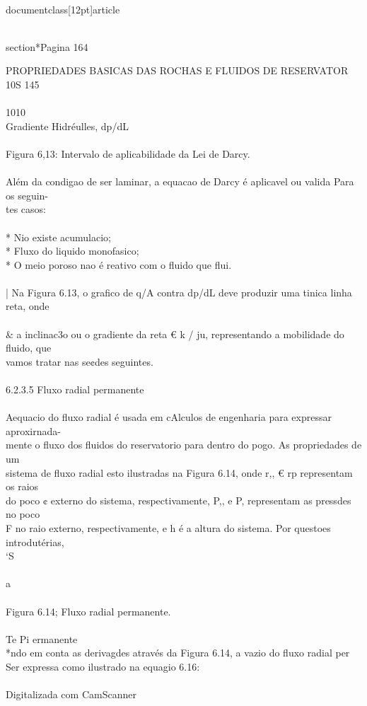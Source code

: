 \\documentclass[12pt]{article}
\begin{document}
\\section*{Pagina 164}

PROPRIEDADES BASICAS DAS ROCHAS E FLUIDOS DE RESERVATOR\\
10S 145\\
\\
1010\\
Gradiente Hidréulles, dp/dL\\
\\
Figura 6,13: Intervalo de aplicabilidade da Lei de Darcy.\\
\\
Além da condigao de ser laminar, a equacao de Darcy é aplicavel ou valida Para os seguin-\\
tes casos:\\
\\
* Nio existe acumulacio;\\
* Fluxo do liquido monofasico;\\
* O meio poroso nao é reativo com o fluido que flui.\\
\\
| Na Figura 6.13, o grafico de q/A contra dp/dL deve produzir uma tinica linha reta, onde\\
\\& a inclinac3o ou o gradiente da reta € k / ju, representando a mobilidade do fluido, que\\
vamos tratar nas se¢des seguintes.\\
\\
6.2.3.5 Fluxo radial permanente\\
\\
Aequacio do fluxo radial é usada em cAlculos de engenharia para expressar aproxirnada-\\
mente o fluxo dos fluidos do reservatorio para dentro do pogo. As propriedades de um\\
sistema de fluxo radial esto ilustradas na Figura 6.14, onde r,, € rp representam os raios\\
do poco ¢ externo do sistema, respectivamente, P,, e P, representam as pressdes no poco\\
F no raio externo, respectivamente, e h é a altura do sistema. Por questoes introdutérias,\\
‘S\\%
\\
a\\
\\
Figura 6.14; Fluxo radial permanente.\\
\\
Te Pi ermanente\\
*ndo em conta as derivagdes através da Figura 6.14, a vazio do fluxo radial per\\
Ser expressa como ilustrado na equagio 6.16:\\
\\
Digitalizada com CamScanner\\
\end{document}
